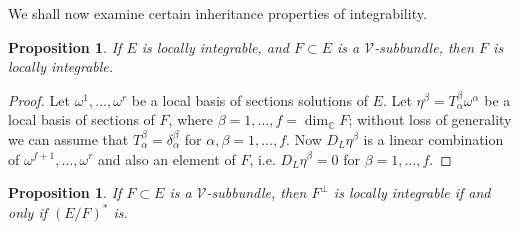 \documentclass[11pt]{amsart}
\newcommand{\C}{\mathbb{C}}
\theoremstyle{definition}
\theoremstyle{remark}
\theoremstyle{plain}
\newtheorem{prop}[defn]{Proposition}
\begin{document}

We shall now examine certain inheritance properties of integrability.

\begin{prop}\label{pro:integrable2} If $E$ is locally integrable, 
and $F\subset E$ is a $\mathcal{V}$-subbundle, then $F$ is locally integrable. 
\end{prop}

\begin{proof}
Let $\omega^1, \dots, \omega^r$ be a local basis of sections solutions of $E$. 
Let $\eta^\beta = T_\alpha^\beta \omega^\alpha$ be a local basis
of sections of $F$, where $\beta = 1,\dots, f = \dim_\C F$; without 
loss of generality we can assume that $T_\alpha^\beta = \delta_\alpha^\beta$
for $\alpha,\beta = 1,\dots, f$.
%
%
 Now $D_{ L} \eta^\beta$ is a linear combination of $\omega^{f+1} , \dots , \omega^r$ and also an element of $F$,
i.e. $D_{ L} \eta^\beta = 0$ for $\beta = 1,\dots, f$. 
\end{proof}
%

\begin{prop}
\label{pro:integrable2} If $F\subset E$ is  a $\mathcal{V}$-subbundle, then $F^\perp$
is locally integrable if and only if $(E/F)^*$ is. 
\end{prop}
\end{document}
